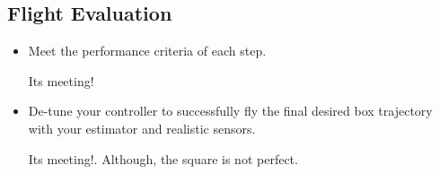 \documentclass{article}
\begin{document}
\subsection{Flight Evaluation}
\begin{itemize}
\item Meet the performance criteria of each step.

Its meeting!
\item De-tune your controller to successfully fly the final desired box trajectory with your estimator and realistic sensors.

Its meeting!. Although, the square is not perfect.
\end{itemize}
\end{document}
